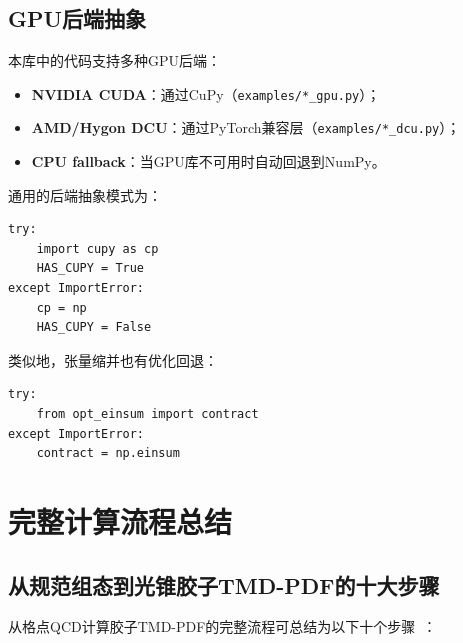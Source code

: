 \documentclass[12pt,a4paper]{ctexart}
\theoremstyle{definition}
\begin{document}
\subsection{GPU后端抽象}

本库中的代码支持多种GPU后端：
\begin{itemize}
    \item \textbf{NVIDIA CUDA}：通过CuPy（\texttt{examples/*\_gpu.py}）；
    \item \textbf{AMD/Hygon DCU}：通过PyTorch兼容层（\texttt{examples/*\_dcu.py}）；
    \item \textbf{CPU fallback}：当GPU库不可用时自动回退到NumPy。
\end{itemize}

通用的后端抽象模式为：
\begin{verbatim}
try:
    import cupy as cp
    HAS_CUPY = True
except ImportError:
    cp = np
    HAS_CUPY = False
\end{verbatim}

类似地，张量缩并也有优化回退：
\begin{verbatim}
try:
    from opt_einsum import contract
except ImportError:
    contract = np.einsum
\end{verbatim}


\section{完整计算流程总结}

\subsection{从规范组态到光锥胶子TMD-PDF的十大步骤}

从格点QCD计算胶子TMD-PDF的完整流程可总结为以下十个步骤~\cite{Chen2025gluon,NoteGluonPDFs}：
\end{document}
